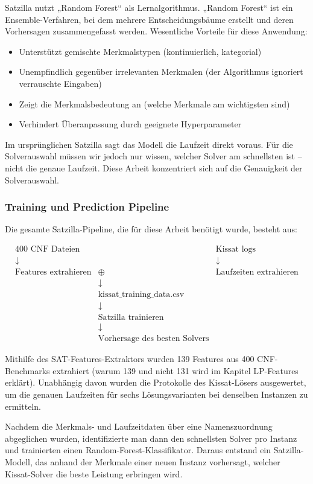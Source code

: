 Satzilla nutzt „Random Forest“  als Lernalgorithmus\cite{breiman2001random}. „Random Forest“ ist ein 
Ensemble-Verfahren, bei dem mehrere Entscheidungsbäume erstellt und deren Vorhersagen zusammengefasst 
werden. Wesentliche Vorteile für diese Anwendung:

\begin{itemize}
    \setlength{\itemsep}{0pt}
    \setlength{\parskip}{0pt}
    \setlength{\parsep}{0pt}
    \item Unterstützt gemischte Merkmalstypen (kontinuierlich, kategorial)
    \item Unempfindlich gegenüber irrelevanten Merkmalen (der Algorithmus ignoriert verrauschte Eingaben)
    \item Zeigt die Merkmalsbedeutung an (welche Merkmale am wichtigsten sind)
    \item Verhindert Überanpassung durch geeignete Hyperparameter
\end{itemize}

\newpage

Im ursprünglichen Satzilla sagt das Modell die Laufzeit direkt voraus. Für die Solverauswahl müssen wir 
jedoch nur wissen, welcher Solver am schnellsten ist – nicht die genaue Laufzeit. Diese Arbeit 
konzentriert sich auf die Genauigkeit der Solverauswahl.

\subsubsection{Training und Prediction Pipeline}

Die gesamte Satzilla-Pipeline, die für diese Arbeit benötigt wurde, besteht aus:

\[
\begin{array}{ccc}
\text{400 CNF Dateien} & & \text{Kissat logs} \\
\downarrow & & \downarrow \\
\text{Features extrahieren} & \oplus & \text{Laufzeiten extrahieren} \\
& \downarrow & \\
& \text{kissat\_training\_data.csv} & \\
& \downarrow & \\
& \text{Satzilla trainieren} & \\
& \downarrow & \\
& \text{Vorhersage des besten Solvers} &
\end{array}
\]

Mithilfe des SAT-Features-Extraktors wurden 139 Features aus 400 CNF-Benchmarks extrahiert (warum 139 und nicht 131 wird im Kapitel LP-Features erklärt). Unabhängig 
davon wurden die Protokolle des Kissat-Lösers ausgewertet, um die genauen Laufzeiten für sechs 
Lösungsvarianten bei denselben Instanzen zu ermitteln. 

Nachdem die Merkmals- und Laufzeitdaten über eine Namenszuordnung abgeglichen wurden, identifizierte 
man dann den schnellsten Solver pro Instanz und trainierten einen Random-Forest-Klassifikator. 
Daraus entstand ein Satzilla-Modell, das anhand der Merkmale einer neuen Instanz vorhersagt, welcher 
Kissat-Solver die beste Leistung erbringen wird.

\newpage

